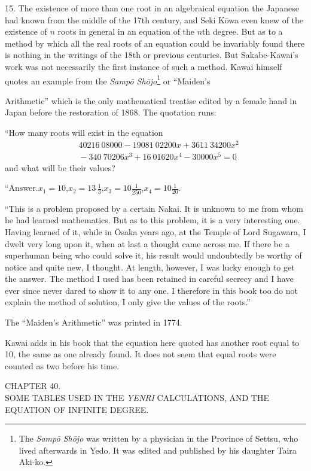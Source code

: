 \documentclass[11pt]{article}
\newcommand{\scanpage}[2]{\clearpage\setcounter{footnote}{0}\noindent{\footnotesize\color{gray}PDF page #1 · #2}\par\medskip}
\begin{document}
15. The existence of more than one root in an algebraical equation the Japanese had known from the middle of the 17th century, and Seki Kōwa even knew of the existence of $n$ roots in general in an equation of the $n$th degree. But as to a method by which all the real roots of an equation could be invariably found there is nothing in the writings of the 18th or previous centuries. But Sakabe-Kawai's work was not necessarily the first instance of such a method. Kawai himself quotes an example from the \emph{Sampō Shōjo}\footnote{The \emph{Sampō Shōjo} was written by a physician in the Province of Settsu, who lived afterwards in Yedo. It was edited and published by his daughter Taira Aki-ko.} or ``Maiden's

\scanpage{0282}{printed page 268}
\noindent Arithmetic'' which is the only mathematical treatise edited by a female hand in Japan before the restoration of 1868. The quotation runs:

``How many roots will exist in the equation
\[
\begin{aligned}
&40216\ 08000 - 19081\ 02200x + 3611\ 34200x^2\\
&{}- 340\ 70206x^3 + 16\ 01620x^4 - 30000x^5 = 0
\end{aligned}
\]
and what will be their values?

``Answer.\quad $x_1 = 10$,\quad $x_2 = 13\,\frac{1}{3}$,\quad $x_3 = 10\frac{1}{250}$,\quad $x_4 = 10\frac{1}{20}$.

``This is a problem proposed by a certain Nakai. It is unknown to me from whom he had learned mathematics. But as to this problem, it is a very interesting one. Having learned of it, while in Ōsaka years ago, at the Temple of Lord Sugawara, I dwelt very long upon it, when at last a thought came across me. If there be a superhuman being who could solve it, his result would undoubtedly be worthy of notice and quite new, I thought. At length, however, I was lucky enough to get the answer. The method I used has been retained in careful secrecy and I have ever since never dared to show it to any one. I therefore in this book too do not explain the method of solution, I only give the values of the roots.''

The ``Maiden's Arithmetic'' was printed in 1774.

Kawai adds in his book that the equation here quoted has another root equal to 10, the same as one already found. It does not seem that equal roots were counted as two before his time.

\begin{center}
CHAPTER 40.\\[1mm]
SOME TABLES USED IN THE \emph{YENRI} CALCULATIONS, AND THE EQUATION OF INFINITE DEGREE.
\end{center}
\end{document}
